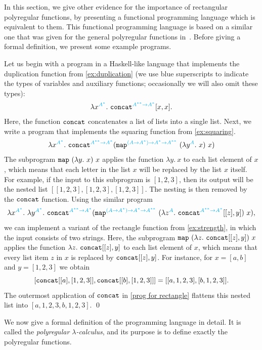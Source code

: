 \documentclass[a4paper,UKenglish,cleveref, autoref, thm-restate]{lipics-v2021}
\begin{document}
In this section, we give other evidence for the importance of rectangular polyregular functions, by presenting a  functional programming language which is equivalent to them. This functional programming language is based on a similar one that was given for the general polyregular functions in~\cite[Section 4.1]{polyregular-survey}. Before giving a formal definition, we present some example programs.

\begin{example} \label{ex:squaring-rectangle-duplication} Let us begin with a program in a Haskell-like language that implements the duplication function from \cref{ex:duplication} (we use blue superscripts to indicate the types of  variables and  auxiliary functions; occasionally we will also omit these types):
    \begin{align*}
    \lambda x^{{\color{cyan}A^*}}.\ \mathtt{concat}^{{\color{cyan}A^{**} \to A^*}} [x,x].
    \end{align*}
Here, the function $\mathtt{concat}$ concatenates a list of lists into a single list. Next, we write a program that implements
     the squaring function from \cref{ex:squaring}. 
    \begin{align*}
    \lambda x^{{\color{cyan}A^*}}.\ \mathtt{concat}^{{\color{cyan}A^{**} \to A^*}} (\mathtt{map}^{{\color{cyan}(A \to A^*) \to A^* \to A^{**}}} \ (\lambda y^{{\color{cyan}A}}.\ x)\ x)
    \end{align*}
The subprogram $\mathtt{map} \ (\lambda y.\ x)\ x$ applies the function $\lambda y. \ x$ to each list element of $x$, which means that each letter in the list $x$ will be replaced by the list $x$ itself. For example, if the input to this subprogram is $[1,2,3]$, then its output will be the nested list $[[1,2,3],[1,2,3],[1,2,3]]$. The nesting is then removed by the $\mathtt{concat}$ function. 
Using the similar program
\begin{equation} \label{prog for rectangle}
    \lambda x^{{\color{cyan}A^*}}.\  \lambda y^{{\color{cyan}A^*}}. \  \mathtt{concat}^{{\color{cyan}A^{**} \to A^*}} ( \mathtt{map}^{{\color{cyan}(A \to A^*) \to A^* \to A^{**}}} \ ( \lambda z^{{\color{cyan}A}} . \ \mathtt{concat}^{{\color{cyan}A^{**} \to A^*}} [[z],y] ) \ x ),
  \end{equation}
 we can implement a variant of the rectangle function from \cref{ex:strength}, in which the input consists of two strings.
 Here, the subprogram $\mapterm \ ( \lambda  z. \  \concatterm [[z],y] ) \ x$ applies the function $\lambda  z. \  \mathtt{concat} [[z],y]$ to each list element of $x$,
 which means that every list item $z$ in $x$ is replaced by $\mathtt{concat} [[z],y]$. For instance, for $x = [a,b]$ and $y = [1,2,3]$ 
 we obtain 
 \[ [  \mathtt{concat} [[a],[1,2,3]], \mathtt{concat} [[b],[1,2,3]] ] = [[a,1,2,3], [b,1,2,3]]. \] 
 The outermost application of $\mathtt{concat}$ in \eqref{prog for rectangle} flattens  this nested list into $[a,1,2,3,b,1,2,3]$.
  \qed
\end{example}
We now  give a formal definition of the  programming language in detail. It is called the \emph{polyregular $\lambda$-calculus}, and its purpose is to define exactly the polyregular functions. 
\end{document}
